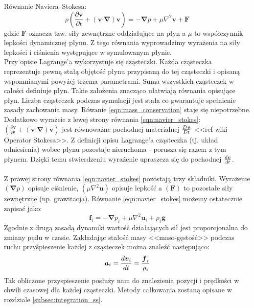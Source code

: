 {\sc Równanie Naviera--Stokesa:}
\begin{equation}
\rho \left( \frac{\partial \boldsymbol{v}}{\partial t} + \left( \boldsymbol{v} \boldsymbol{\cdot} \boldsymbol{\nabla} \right) \boldsymbol{v} \right) = -\boldsymbol{\nabla} p + \mu \nabla^{2} \boldsymbol{v} + \boldsymbol{F}
\label{eqn:navier_stokes}
\end{equation}
gdzie $\boldsymbol{F}$ oznacza tzw. siły zewnętrzne oddziałujące na płyn a $\mu$ to współczynnik lepkości dynamicznej płynu. Z tego równania wyprowadzimy wyrażenia na siły lepkości i ciśnienia występujące w symulowanym płynie.\\
Przy opisie Lagrange'a wykorzystuje się cząsteczki. Każda cząsteczka reprezentuje pewną stałą objętość płynu przypisaną do tej cząsteczki i opisaną wspomnianymi powyżej trzema parametrami. Suma wszystkich cząsteczek w całości definiuje płyn. Takie założenia znacząco ułatwiają równania opisujące płyn. Liczba cząsteczek podczas symulacji jest stała co gwarantuje spełnienie zasady zachowania masy. Rówanie \eqref{eqn:mass_conservation} staje się niepotrzebne. Dodatkowo wyrażeie z lewej strony równania \eqref{eqn:navier_stokes}: $\left( \frac{\partial \boldsymbol{v}}{\partial t} + \left( \boldsymbol{v} \boldsymbol{\cdot} \boldsymbol{\nabla} \right) \boldsymbol{v} \right)$ jest równoważne pochodnej materialnej ${D\boldsymbol{v} \over Dt}$ <<ref wiki Operator Stokesa>>. Z definicji opisu Lagrange'a cząsteczka (tj. układ odniesienia) wobec płynu pozostaje nieruchoma - porusza się razem z tym płynem. Dzięki temu stwierdzeniu wyrażenie upraszcza się do pochodnej ${d\boldsymbol{v} \over dt}$.
\par

\paragraph{}
Z prawej strony równania \eqref{eqn:navier_stokes} pozostają trzy składniki. Wyrażenie $\left( \boldsymbol{\nabla} p \right)$ opisuje ciśnienie, $\left( \mu \nabla^{2} \boldsymbol{u} \right)$ opisuje lepkość a $\left( \boldsymbol{F} \right)$ to pozostałe siły zewnętrzne (np. grawitacja). Równanie \eqref{eqn:navier_stokes} możemy ostatecznie zapisać jako:
\begin{equation}
\boldsymbol{f}_i = -\boldsymbol{\nabla} p_i + \mu \nabla^{2} \boldsymbol{u}_i + \rho_i \boldsymbol{g}
\label{eqn:navier_stokes_lagrangian}
\end{equation}
Zgodnie z drugą zasadą dynamiki wartość działających sił jest proporcjonalna do zmiany pędu w czasie. Zakładając stałość masy <<maso-gęstość>> podczas ruchu przyśpieszenie każdej z cząsteczek można znaleźć następująco:
\begin{equation}
\boldsymbol{a}_i = {d\boldsymbol{v}_i \over dt} = {\boldsymbol{f}_i \over \rho_i}
\label{eqn:acc}
\end{equation}
Tak obliczone przyspieszenie posłuży nam do znalezienia pozycji i prędkości w chwili czasowej dla każdej cząsteczki. Metody całkowania zostaną opisane w rozdziale \eqref{subsec:integration_ss}.
\par


